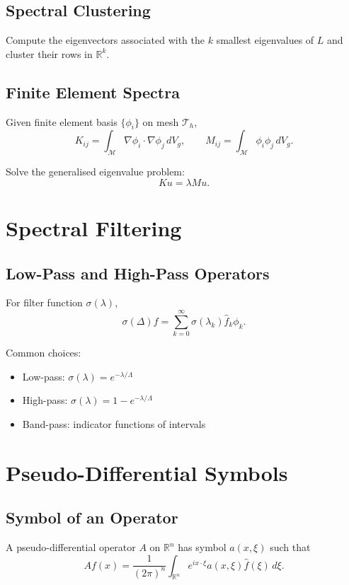 \subsection{Spectral Clustering}

Compute the eigenvectors associated with the $k$ smallest eigenvalues of $L$ and cluster their rows in $\mathbb{R}^k$.

\subsection{Finite Element Spectra}

Given finite element basis $\{\phi_i\}$ on mesh $\mathcal{T}_h$,
\[
K_{ij} = \int_{\mathcal{M}} \nabla\phi_i\cdot\nabla\phi_j\, dV_g,
\qquad
M_{ij} = \int_{\mathcal{M}} \phi_i \phi_j \, dV_g.
\]

Solve the generalised eigenvalue problem:
\[
K u = \lambda M u.
\]

\section{Spectral Filtering}

\subsection{Low-Pass and High-Pass Operators}

For filter function $\sigma(\lambda)$,
\[
\sigma(\Delta) f
  = \sum_{k=0}^\infty \sigma(\lambda_k) \hat{f}_k \phi_k.
\]

Common choices:
\begin{itemize}
\item Low-pass: $\sigma(\lambda)=e^{-\lambda/\Lambda}$  
\item High-pass: $\sigma(\lambda)=1-e^{-\lambda/\Lambda}$  
\item Band-pass: indicator functions of intervals  
\end{itemize}

\section{Pseudo-Differential Symbols}

\subsection{Symbol of an Operator}

A pseudo-differential operator $A$ on $\mathbb{R}^n$ has symbol $a(x,\xi)$ such that
\[
Af(x)
  = \frac{1}{(2\pi)^n}
    \int_{\mathbb{R}^n}
    e^{i x\cdot\xi} a(x,\xi)\widehat{f}(\xi)\, d\xi.
\]

